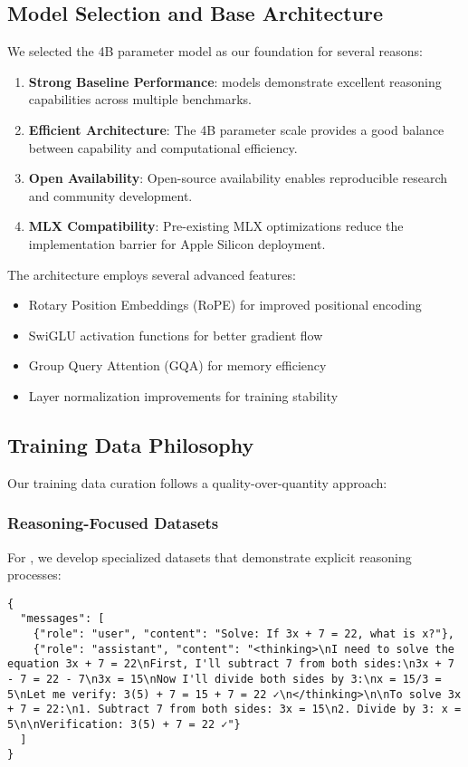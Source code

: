 \subsection{Model Selection and Base Architecture}

We selected the \qwen{} 4B parameter model as our foundation for several reasons:

\begin{enumerate}
    \item \textbf{Strong Baseline Performance}: \qwen{} models demonstrate excellent reasoning capabilities across multiple benchmarks.
    \item \textbf{Efficient Architecture}: The 4B parameter scale provides a good balance between capability and computational efficiency.
    \item \textbf{Open Availability}: Open-source availability enables reproducible research and community development.
    \item \textbf{MLX Compatibility}: Pre-existing MLX optimizations reduce the implementation barrier for Apple Silicon deployment.
\end{enumerate}

The \qwen{} architecture employs several advanced features:
\begin{itemize}
    \item Rotary Position Embeddings (RoPE) for improved positional encoding
    \item SwiGLU activation functions for better gradient flow
    \item Group Query Attention (GQA) for memory efficiency
    \item Layer normalization improvements for training stability
\end{itemize}

\subsection{Training Data Philosophy}

Our training data curation follows a quality-over-quantity approach:

\subsubsection{Reasoning-Focused Datasets}
For \supra{}, we develop specialized datasets that demonstrate explicit reasoning processes:

\begin{lstlisting}[caption=Example thinking-mode training sample,label=lst:thinking-example]
{
  "messages": [
    {"role": "user", "content": "Solve: If 3x + 7 = 22, what is x?"},
    {"role": "assistant", "content": "<thinking>\nI need to solve the equation 3x + 7 = 22\nFirst, I'll subtract 7 from both sides:\n3x + 7 - 7 = 22 - 7\n3x = 15\nNow I'll divide both sides by 3:\nx = 15/3 = 5\nLet me verify: 3(5) + 7 = 15 + 7 = 22 ✓\n</thinking>\n\nTo solve 3x + 7 = 22:\n1. Subtract 7 from both sides: 3x = 15\n2. Divide by 3: x = 5\n\nVerification: 3(5) + 7 = 22 ✓"}
  ]
}
\end{lstlisting}


